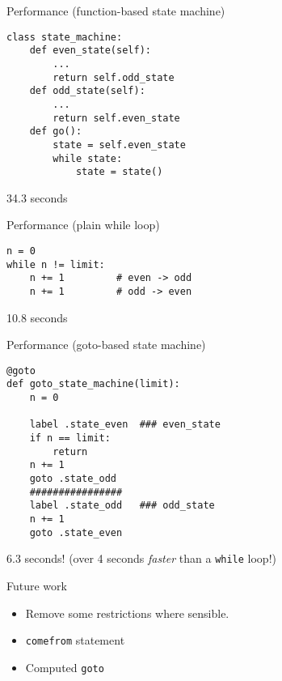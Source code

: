 \documentclass{beamer}
\begin{document}
\begin{frame}[fragile]{Performance (function-based state machine)}

\begin{verbatim}
class state_machine:
    def even_state(self):
        ...
        return self.odd_state
    def odd_state(self):
        ...
        return self.even_state
    def go():
        state = self.even_state
        while state:
            state = state()
\end{verbatim}
34.3 seconds
\end{frame}


\begin{frame}[fragile]{Performance (plain while loop)}
\begin{verbatim}
n = 0
while n != limit:
    n += 1         # even -> odd
    n += 1         # odd -> even
\end{verbatim}
10.8 seconds
\end{frame}

\begin{frame}[fragile]{Performance (goto-based state machine)}
\begin{verbatim}
@goto
def goto_state_machine(limit):
    n = 0

    label .state_even  ### even_state
    if n == limit:
        return
    n += 1
    goto .state_odd
    ################
    label .state_odd   ### odd_state
    n += 1
    goto .state_even
\end{verbatim}
\pause
\alert{6.3 seconds!}  (over 4 seconds \emph{faster} than a \verb!while! loop!)
\end{frame}

\begin{frame}[fragile]{Future work}

\begin{itemize}
\item Remove some restrictions where sensible.
\item \verb!comefrom! statement
\item Computed \verb!goto!
\end{itemize}

\end{frame}
\end{document}
